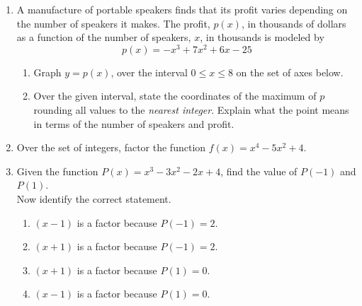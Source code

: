 \documentclass[12pt, twoside]{article}
\begin{document}
\begin{enumerate}[itemsep=0.5cm]
\item A manufacture of portable speakers finds that its profit varies depending on the number of speakers it makes. The profit, $p(x)$, in thousands of dollars as a function of the number of speakers, $x$, in thousands is modeled by $$p(x) = -x^3+7x^2+6x-25$$
\begin{enumerate}
    \item Graph $y=p(x)$, over the interval $0 \leq x \leq 8$ on the set of axes below.
    \item Over the given interval, state the coordinates of the maximum of $p$ rounding all values to the \emph{nearest integer}. Explain what the point means in terms of the number of speakers and profit. \vspace{3cm}
\end{enumerate}
\begin{center}
    \end{center}

\newpage
\item Over the set of integers, factor the function $f(x) = x^4-5x^2+4$. \vspace{10cm}

\item Given the function $P(x) = x^3-3x^2-2x+4$, find the value of $P(-1)$ and $P(1)$.\\[5cm]
Now identify the correct statement.
\begin{enumerate}
    \item $(x-1)$ is a factor because $P(-1)=2$.
    \item $(x+1)$ is a factor because $P(-1)=2$.
    \item $(x+1)$ is a factor because $P(1)=0$.
    \item $(x-1)$ is a factor because $P(1)=0$.
\end{enumerate}


\end{enumerate}
\end{document}
